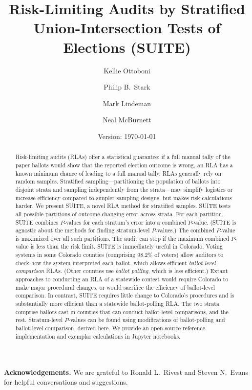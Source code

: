 \documentclass[runningheads]{llncs}
\title{Risk-Limiting Audits by Stratified Union-Intersection Tests of Elections (SUITE)}
\author{
   Kellie Ottoboni\inst{1}\orcidID{0000-0002-9107-3402} \and
   Philip B.~Stark\inst{1}\orcidID{0000-0002-3771-9604} \and
   Mark Lindeman\inst{2}\orcidID{0000-0001-8815-815X} \and
   Neal McBurnett\orcidID{0000-0001-8667-1830} 
}
\institute{
Department of Statistics, University of California, Berkeley, CA, USA \and
Verified Voting Foundation}
\date{Version: \today}
\begin{document}
\maketitle


\begin{abstract}
Risk-limiting audits (RLAs) offer a statistical guarantee: if a full manual tally of the paper ballots would show that the reported election outcome is wrong, an RLA has a known minimum chance of leading to a full manual tally.
RLAs generally rely on random samples.
Stratified sampling---partitioning the population of ballots into disjoint
strata and sampling independently from the strata---may simplify logistics or increase efficiency compared
to simpler sampling designs, but makes risk calculations harder.
We present SUITE, a novel RLA method for stratified samples.
SUITE tests all possible partitions of outcome-changing error across strata.
For each partition, SUITE combines $P$-values for each stratum's error into a combined
$P$-value.
(SUITE is agnostic about the methods for finding stratum-level $P$-values.) 
The combined $P$-value is maximized over all such partitions. 
The audit can stop if the maximum combined $P$-value is less than the risk limit.
SUITE is immediately useful in Colorado.
Voting systems in some Colorado counties (comprising 98.2\% of voters)
allow auditors to check how the system interpreted each ballot, 
which allows efficient \emph{ballot-level comparison} RLAs.
(Other counties use \emph{ballot polling}, which is less efficient.)
Extant approaches to conducting an RLA of a statewide contest would require Colorado to make major procedural changes, or would sacrifice the efficiency of ballot-level comparison.
In contrast, SUITE requires little change to Colorado's procedures and is substantially more efficient than
a statewide ballot-polling RLA.
The two strata comprise ballots cast in counties that can conduct ballot-level comparisons, and the rest.
Stratum-level $P$-values can be found using modifications of ballot-polling and ballot-level 
comparison, derived here.
We provide an open-source reference implementation and exemplar calculations in Jupyter notebooks.

\end{abstract}

\noindent
\textbf{Acknowledgements.}
We are grateful to Ronald L.~Rivest and Steven N.~Evans for helpful conversations and suggestions.
\end{document}
